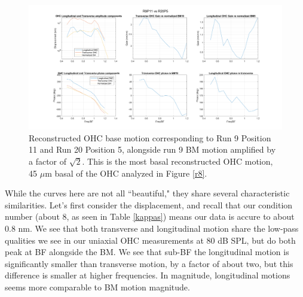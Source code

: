 \documentclass{article}
\begin{document}
\begin{figure}
	\centering
	\includegraphics[width=\textwidth]{"Figures/R9P11OHC.png"}
	\caption{Reconstructed OHC base motion corresponding to Run 9 Position 11 and Run 20 Position 5, alongside run 9 BM motion amplified by a factor of $\sqrt{2}$. This is the most basal reconstructed OHC motion, 45 $\mu$m basal of the OHC analyzed in Figure \ref{r8}.}
	\label{r11}
\end{figure}

\par{While the curves here are not all ``beautiful," they share several characteristic similarities. Let's first consider the displacement, and recall that our condition number (about 8, as seen in Table \ref{kappas}) means our data is accure to about 0.8 nm. We see that both transverse and longitudinal motion share the low-pass qualities we see in our uniaxial OHC measurements at 80 dB SPL, but do both peak at BF alongside the BM. We see that sub-BF the longitudinal motion is significantly smaller than transverse motion, by a factor of about two, but this difference is smaller at higher frequencies. In magnitude, longitudinal motions seems more comparable to BM motion magnitude.}
\end{document}
